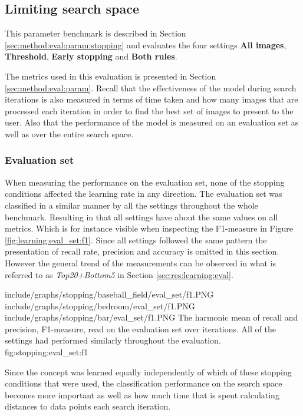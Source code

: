 
\subsection{Limiting search space}
\label{sec:res:stopping}

This parameter benchmark is described in Section \ref{sec:method:eval:param:stopping} and evaluates the four settings 
\textbf{All images}, \textbf{Threshold}, \textbf{Early stopping} and \textbf{Both rules}.

The metrics used in this evaluation is presented in Section \ref{sec:method:eval:param}. Recall that the effectiveness of the model during search iterations is also measured in terms of time taken and how many images that are processed each iteration in order to find the best set of images to present to the user. Also that the performance of the model is measured on an evaluation set as well as over the entire search space. 

\subsubsection{Evaluation set}
When measuring the performance on the evaluation set, none of the stopping conditions affected the learning rate in any direction. The evaluation set was  classified in a similar manner by all the settings throughout the whole benchmark. 
Resulting in that all settings have about the same values on all metrics. Which is for instance visible when inspecting the F1-measure in Figure \ref{fig:learning:eval_set:f1}. Since all settings followed the same pattern the presentation of recall rate, precision and accuracy is omitted in this section. However the general trend of the measurements can be observed in what is referred to as \emph{Top20+Bottom5} in Section \ref{sec:res:learning:eval}.

\tripfigure
{include/graphs/stopping/baseball_field/eval_set/f1.PNG}
{include/graphs/stopping/bedroom/eval_set/f1.PNG}
{include/graphs/stopping/bar/eval_set/f1.PNG}
{The harmonic mean of recall and precision, F1-measure, read on the evaluation set over iterations. All of the settings had performed similarly throughout the evaluation.}
{fig:stopping:eval_set:f1}

Since the concept was learned equally independently of which of these stopping conditions that were used, the classification performance on the search space becomes more important as well as how much time that is spent calculating distances to data points each search iteration.

